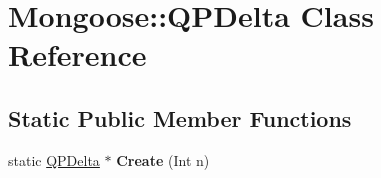 \hypertarget{class_mongoose_1_1_q_p_delta}{}\section{Mongoose\+:\+:Q\+P\+Delta Class Reference}
\label{class_mongoose_1_1_q_p_delta}
\subsection*{Static Public Member Functions}
\begin{DoxyCompactItemize}
\item 
static \hyperlink{class_mongoose_1_1_q_p_delta}{Q\+P\+Delta} $\ast$ {\bfseries Create} (Int n)\hypertarget{class_mongoose_1_1_q_p_delta_a240db8c0c960626897428e3dc6d101ab}{}\label{class_mongoose_1_1_q_p_delta_a240db8c0c960626897428e3dc6d101ab}

\end{DoxyCompactItemize}
